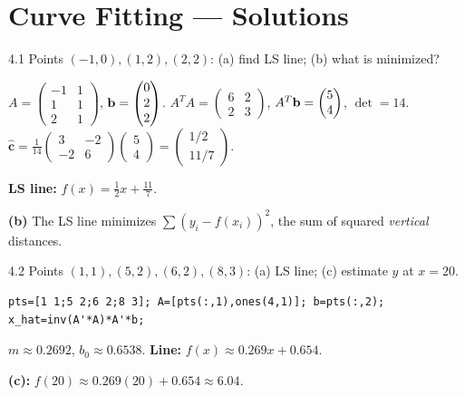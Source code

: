 \chapter{Curve Fitting --- Solutions}

\begin{exercise}{4.1}
Points $(-1,0),(1,2),(2,2)$: (a) find LS line; (b) what is minimized?
\end{exercise}
\begin{solution}
$A=\begin{pmatrix}-1&1\\1&1\\2&1\end{pmatrix}$, $\mathbf{b}=\begin{pmatrix}0\\2\\2\end{pmatrix}$.
$A^TA=\begin{pmatrix}6&2\\2&3\end{pmatrix}$, $A^T\mathbf{b}=\begin{pmatrix}5\\4\end{pmatrix}$, $\det=14$.
$\hat{\mathbf{c}}=\frac{1}{14}\begin{pmatrix}3&-2\\-2&6\end{pmatrix}\begin{pmatrix}5\\4\end{pmatrix}=\begin{pmatrix}1/2\\11/7\end{pmatrix}$.

\textbf{LS line:} $f(x)=\tfrac{1}{2}x+\tfrac{11}{7}$.

\textbf{(b)} The LS line minimizes $\sum(y_i-f(x_i))^2$, the sum of squared \emph{vertical} distances.
\end{solution}

\begin{exercise}{4.2}
Points $(1,1),(5,2),(6,2),(8,3)$: (a) LS line; (c) estimate $y$ at $x=20$.
\end{exercise}
\begin{solution}
\begin{lstlisting}
pts=[1 1;5 2;6 2;8 3]; A=[pts(:,1),ones(4,1)]; b=pts(:,2);
x_hat=inv(A'*A)*A'*b;
\end{lstlisting}
$m\approx0.2692$, $b_0\approx0.6538$. \textbf{Line:} $f(x)\approx0.269x+0.654$.

\textbf{(c):} $f(20)\approx0.269(20)+0.654\approx6.04$.
\end{solution}


